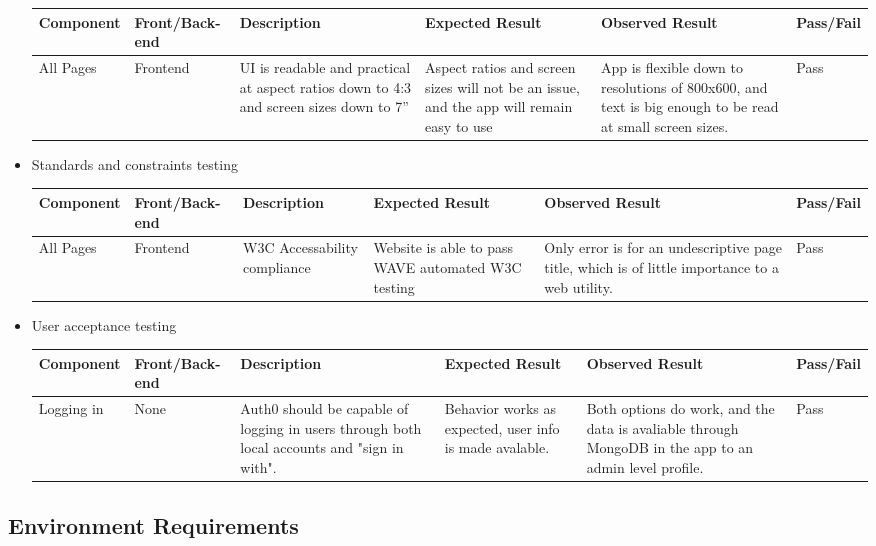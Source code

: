 \begin{center}
\begin{itemize}
\begin{tabular}{|p{1.9cm}|p{1.9cm}|p{1.9cm}|p{1.9cm}|p{1.9cm}|p{1.9cm}|}
  Component & Front/Back-end & Description & Expected Result & Observed Result & Pass/Fail\\ \hline
  All Pages & Frontend & UI is readable and practical at aspect ratios down to 4:3 and screen sizes down to 7'' & Aspect ratios and screen sizes will not be an issue, and the app will remain easy to use & App is flexible down to resolutions of 800x600, and text is big enough to be read at small screen sizes. & Pass \\ \hline
  \end{tabular}
\item
  Standards and constraints testing\\
  \begin{tabular}{|p{1.9cm}|p{1.9cm}|p{1.9cm}|p{1.9cm}|p{1.9cm}|p{1.9cm}|}\hline
  Component & Front/Back-end & Description & Expected Result & Observed Result & Pass/Fail\\ \hline
  All Pages & Frontend & W3C Accessability compliance & Website is able to pass WAVE automated W3C testing & Only error is for an undescriptive page title, which is of little importance to a web utility.  & Pass  \\ \hline 
  \end{tabular}
\item
  User acceptance testing\\
  \begin{tabular}{|p{1.9cm}|p{1.9cm}|p{1.9cm}|p{1.9cm}|p{1.9cm}|p{1.9cm}|}\hline
  Component & Front/Back-end & Description & Expected Result & Observed Result & Pass/Fail\\ \hline
  Logging in & None & Auth0 should be capable of logging in users through both local accounts and "sign in with". & Behavior works as expected, user info is made avalable.& Both options do work, and the data is avaliable through MongoDB in the app to an admin level profile. & Pass \\ \hline
  \end{tabular}
\end{itemize}
\end{center}

\subsection{\texorpdfstring{ Environment
Requirements}{ Environment Requirements}}


